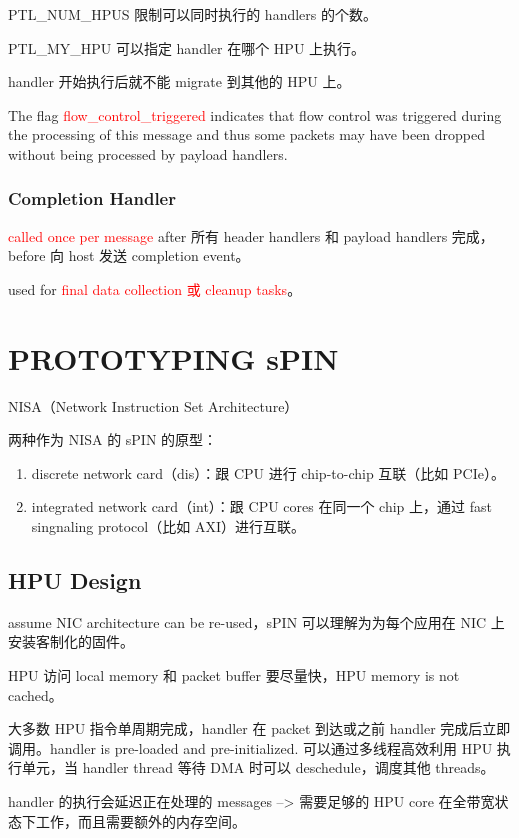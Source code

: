 \documentclass[cn,pad,11pt,green,geye]{../elegantnote}
\begin{document}
PTL\_NUM\_HPUS 限制可以同时执行的 handlers 的个数。

PTL\_MY\_HPU 可以指定 handler 在哪个 HPU 上执行。

handler 开始执行后就不能 migrate 到其他的 HPU 上。

The flag \textcolor{red}{flow\_control\_triggered} indicates that flow control was triggered during the processing of this message and thus some packets may have been dropped without being processed by payload handlers.

\subsubsection{Completion Handler}
\textcolor{red}{called once per message} after 所有 header handlers 和 payload handlers 完成，before 向 host 发送 completion event。

used for \textcolor{red}{final data collection 或 cleanup tasks}。

\section{PROTOTYPING sPIN}
NISA（Network Instruction Set Architecture）

两种作为 NISA 的 sPIN 的原型：
\begin{enumerate}
   \item discrete network card（dis）：跟 CPU 进行 chip-to-chip 互联（比如 PCIe）。
   \item integrated network card（int）：跟 CPU cores 在同一个 chip 上，通过 fast singnaling protocol（比如 AXI）进行互联。
\end{enumerate}

\subsection{HPU Design}
assume NIC architecture can be re-used，sPIN 可以理解为为每个应用在 NIC 上安装客制化的固件。

HPU 访问 local memory 和 packet buffer 要尽量快，HPU memory is not cached。

大多数 HPU 指令单周期完成，handler 在 packet 到达或之前 handler 完成后立即调用。handler is pre-loaded and pre-initialized. 可以通过多线程高效利用 HPU 执行单元，当 handler thread 等待 DMA 时可以 deschedule，调度其他 threads。

handler 的执行会延迟正在处理的 messages --> 需要足够的 HPU core 在全带宽状态下工作，而且需要额外的内存空间。
\end{document}
